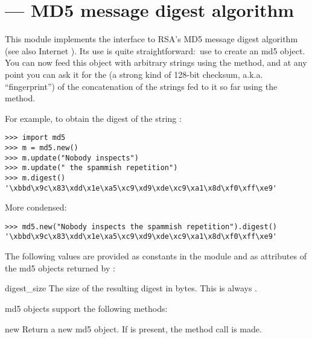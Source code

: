 \section{ ---
         MD5 message digest algorithm}



This module implements the interface to RSA's MD5 message digest
algorithm (see also Internet ).  Its use is quite
straightforward:\ use  to create an md5 object.
You can now feed this object with arbitrary strings using the
 method, and at any point you can ask it for the
 (a strong kind of 128-bit checksum,
a.k.a. ``fingerprint'') of the concatenation of the strings fed to it
so far using the  method.

For example, to obtain the digest of the string :

\begin{verbatim}
>>> import md5
>>> m = md5.new()
>>> m.update("Nobody inspects")
>>> m.update(" the spammish repetition")
>>> m.digest()
'\xbbd\x9c\x83\xdd\x1e\xa5\xc9\xd9\xde\xc9\xa1\x8d\xf0\xff\xe9'
\end{verbatim}

More condensed:

\begin{verbatim}
>>> md5.new("Nobody inspects the spammish repetition").digest()
'\xbbd\x9c\x83\xdd\x1e\xa5\xc9\xd9\xde\xc9\xa1\x8d\xf0\xff\xe9'
\end{verbatim}

The following values are provided as constants in the module and as
attributes of the md5 objects returned by :

\begin{datadesc}{digest_size}
  The size of the resulting digest in bytes.  This is always
  .
\end{datadesc}

md5 objects support the following methods:

\begin{funcdesc}{new}{}
Return a new md5 object.  If  is present, the method call
 is made.
\end{funcdesc}


